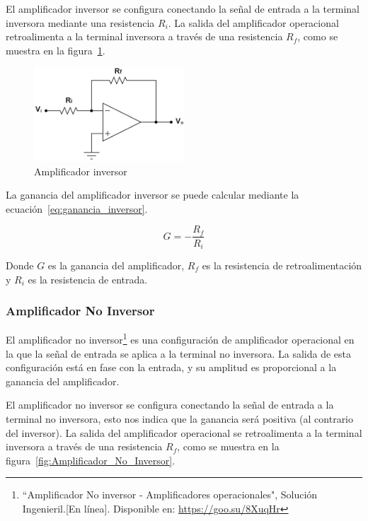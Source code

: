             El amplificador inversor se configura conectando la señal de entrada a la terminal inversora mediante una resistencia $R_i$. La salida del amplificador operacional retroalimenta a la terminal inversora a través de una resistencia $R_f$, como se muestra en la figura~\ref{fig:Amplificador_Inversor}.
            
            \begin{figure}[H]
                \centering
                \includegraphics[width=0.5\textwidth]{img/Desarrollo/Amplificador_Inversor.png}
                \caption[Amplificador inversor]{Amplificador inversor\footnotemark}
                \label{fig:Amplificador_Inversor}
            \end{figure}

            La ganancia del amplificador inversor se puede calcular mediante la ecuación~\ref{eq:ganancia_inversor}.

            \begin{equation}
                \label{eq:ganancia_inversor}
                G = -\frac{R_f}{R_i}
            \end{equation}

            Donde $G$ es la ganancia del amplificador, $R_f$ es la resistencia de retroalimentación y $R_i$ es la resistencia de entrada.

        \subsubsection{Amplificador No Inversor}
            El amplificador no inversor\footnote{``Amplificador No inversor - Amplificadores operacionales", Solución Ingenieril.[En línea]. Disponible en: \url{https://goo.su/8XuqHr}} es una configuración de amplificador operacional en la que la señal de entrada se aplica a la terminal no inversora. La salida de esta configuración está en fase con la entrada, y su amplitud es proporcional a la ganancia del amplificador.

            El amplificador no inversor se configura conectando la señal de entrada a la terminal no inversora, esto nos indica que la ganancia será positiva (al contrario del inversor). La salida del amplificador operacional se retroalimenta a la terminal inversora a través de una resistencia $R_f$, como se muestra en la figura~\ref{fig:Amplificador_No_Inversor}.

